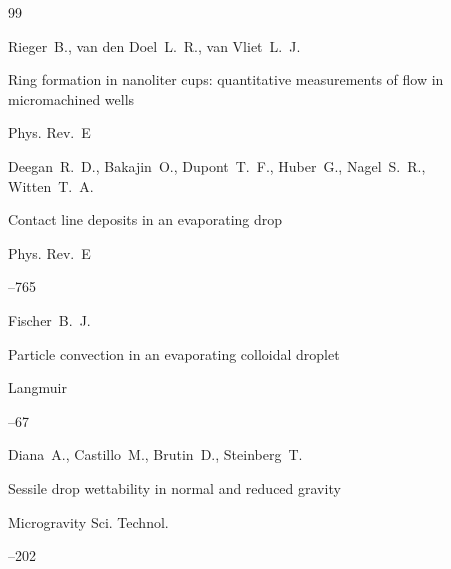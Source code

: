 \begin{thebibliography}{99}

\by Rieger~B., van den Doel~L.~R., van Vliet~L.~J.

\paper Ring formation in nanoliter cups: quantitative measurements of flow in micromachined wells 

\jour Phys. Rev.~E









\by Deegan~R.~D., Bakajin~O., Dupont~T.~F., Huber~G., Nagel~S.~R., Witten~T.~A.

\paper  Contact line deposits in an evaporating drop

\jour Phys. Rev.~E




--765





\by Fischer~B.~J.

\paper  Particle convection in an evaporating colloidal droplet 

\jour Langmuir




--67





\by Diana~A., Castillo~M., Brutin~D., Steinberg~T.

\paper  Sessile drop wettability in normal and reduced gravity 

\jour Microgravity Sci. Technol.




--202





\end{thebibliography}
